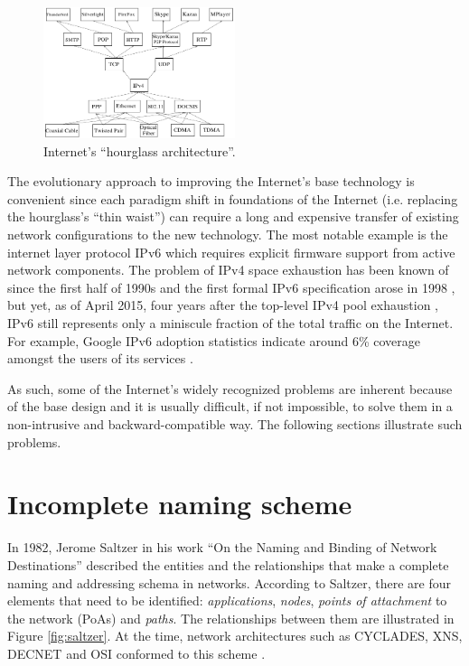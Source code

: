     \begin{figure}[H]
        \begin{center}
            \includegraphics[width=0.5\textwidth]{fig/problems_hourglass.png}
          \caption{Internet's ``hourglass architecture''.}
          \label{fig:inet_hourglass}
        \end{center}
    \end{figure}


    The evolutionary approach to improving the Internet's base technology is convenient since each paradigm shift in foundations of the Internet (i.e. replacing the hourglass's ``thin waist'') can require a long and expensive transfer of existing network configurations to the new technology. The most notable example is the internet layer protocol IPv6 which requires explicit firmware support from active network components. The problem of IPv4 space exhaustion has been known of since the first half of 1990s \cite{rfc1631} and the first formal IPv6 specification arose in 1998 \cite{rfc2460}, but yet, as of April 2015, four years after the top-level IPv4 pool exhaustion \cite{ipv4_exhaustion}, IPv6 still represents only a miniscule fraction of the total traffic on the Internet. For example, Google IPv6 adoption statistics indicate around 6\% coverage amongst the users of its services \cite{ipv6stats}.

    As such, some of the Internet's widely recognized problems are inherent because of the base design and it is usually difficult, if not impossible, to solve them in a non-intrusive and backward-compatible way. The following sections illustrate such problems.

    \section{Incomplete naming scheme}\label{problems:naming}

        In 1982, Jerome Saltzer in his work ``On the Naming and Binding of Network Destinations'' \cite{rfc1498} described the entities and the relationships that make a complete naming and addressing schema in networks. According to Saltzer, there are four elements that need to be identified: \emph{applications}, \emph{nodes}, \emph{points of attachment} to the network (PoAs) and \emph{paths}. The relationships between them are illustrated in Figure \ref{fig:saltzer}. At the time, network architectures such as CYCLADES, XNS, DECNET and OSI conformed to this scheme \cite{internet_demo}.

